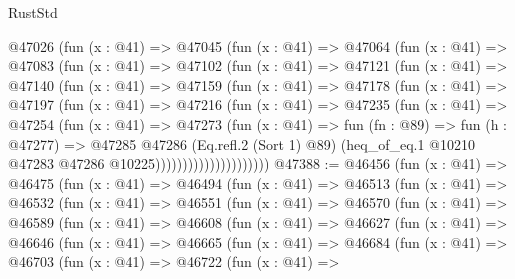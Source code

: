 \begin{lexlean}{RustStd}
\begin{coremodule}
              @47026
                (fun (x : @41) =>
                @47045
                  (fun (x : @41) =>
                  @47064
                    (fun (x : @41) =>
                    @47083
                      (fun (x : @41) =>
                      @47102
                        (fun (x : @41) =>
                        @47121
                          (fun (x : @41) =>
                          @47140
                            (fun (x : @41) =>
                            @47159
                              (fun (x : @41) =>
                              @47178
                                (fun (x : @41) =>
                                @47197
                                  (fun (x : @41) =>
                                  @47216
                                    (fun (x : @41) =>
                                    @47235
                                      (fun (x : @41) =>
                                      @47254
                                        (fun (x : @41) =>
                                        @47273
                                          (fun (x : @41) =>
                                          fun (fn : @89) =>
                                          fun (h : @47277) =>
                                          @47285
                                            @47286
                                            (Eq.refl.{2} (Sort 1) @89)
                                            (heq_of_eq.{1}
                                              @10210
                                              @47283
                                              @47286
                                              @10225)))))))))))))))))))))
@47388 := @46456
    (fun (x : @41) =>
    @46475
      (fun (x : @41) =>
      @46494
        (fun (x : @41) =>
        @46513
          (fun (x : @41) =>
          @46532
            (fun (x : @41) =>
            @46551
              (fun (x : @41) =>
              @46570
                (fun (x : @41) =>
                @46589
                  (fun (x : @41) =>
                  @46608
                    (fun (x : @41) =>
                    @46627
                      (fun (x : @41) =>
                      @46646
                        (fun (x : @41) =>
                        @46665
                          (fun (x : @41) =>
                          @46684
                            (fun (x : @41) =>
                            @46703
                              (fun (x : @41) =>
                              @46722
                                (fun (x : @41) =>

\end{coremodule}
\end{lexlean}
